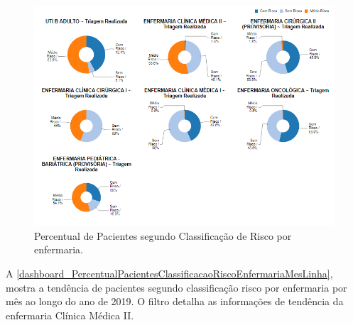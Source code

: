 \begin{figure}[htb]
	\caption{\label{dashboard_PercentualPacientesClassificacaoRiscoEnfermariaAnoPizza}Percentual de Pacientes segundo Classificação de Risco por enfermaria.}
	\begin{center}
	    \includegraphics[scale=0.6]{Imagens/2.3.PercentualPacientesClassificacaoRiscoEnfermariaAnoPizza.png}
	\end{center}
\end{figure}

\clearpage
A \autoref{dashboard_PercentualPacientesClassificacaoRiscoEnfermariaMesLinha}, mostra a tendência de pacientes segundo classificação risco por enfermaria por mês ao longo do ano de 2019. O filtro detalha as informações de tendência da enfermaria Clínica Médica II.

